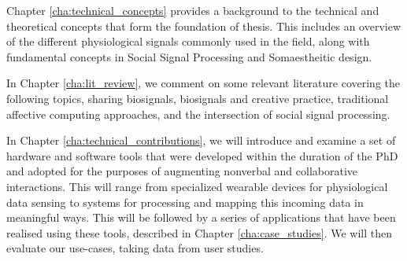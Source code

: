 Chapter \ref{cha:technical_concepts} provides a background to the technical and theoretical concepts that form the foundation of thesis. This includes an overview of the different physiological signals commonly used in the field, along with fundamental concepts in Social Signal Processing and Somaestheitic design. 

In Chapter \ref{cha:lit_review}, we comment on some relevant literature covering the following topics, sharing biosignals, biosignals and creative practice, traditional affective computing approaches, and the intersection of social signal processing.

In Chapter \ref{cha:technical_contributions}, we will introduce and examine a set of hardware and software tools that were developed within the duration of the PhD and adopted for the purposes of augmenting nonverbal and collaborative interactions. This will range from specialized wearable devices for physiological data sensing to systems for processing and mapping this incoming data in meaningful ways. This will be followed by a series of applications that have been realised using these tools, described in Chapter \ref{cha:case_studies}. We will then evaluate our use-cases, taking data from user studies.  

